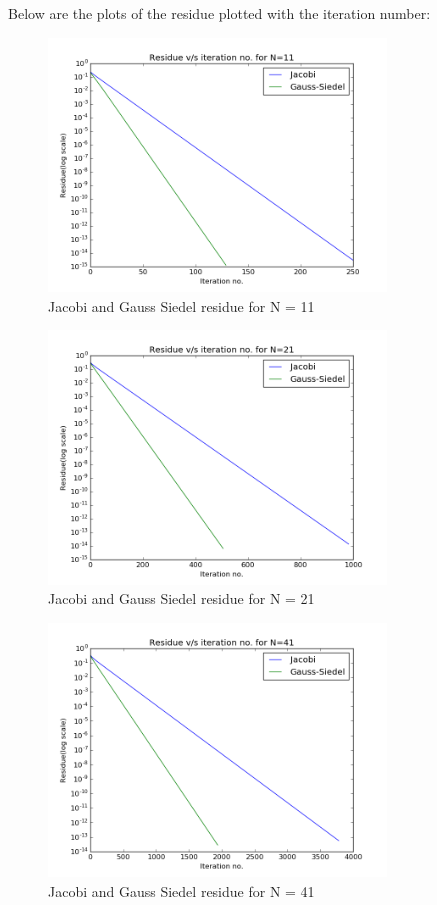 \documentclass[11pt, a4paper]{article}
\begin{document}
Below are the plots of the residue plotted with the iteration number:
\begin{figure}[H]
 \centering
 \includegraphics[width = 0.8\textwidth]{N_11_1.png}
 \caption{Jacobi and Gauss Siedel residue for N = 11}
\end{figure}

\begin{figure}[H]
 \centering
 \includegraphics[width = 0.8\textwidth]{N_21_1.png}
 \caption{Jacobi and Gauss Siedel residue for N = 21}
\end{figure}

\begin{figure}[H]
 \centering
 \includegraphics[width = 0.8\textwidth]{N_41_1.png}
 \caption{Jacobi and Gauss Siedel residue for N = 41}
\end{figure}
\end{document}
